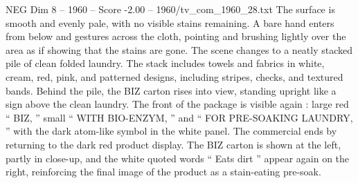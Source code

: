 \begin{textsample}{NEG Dim 8 – 1960 – Score -2.00 – 1960/tv\_com\_1960\_28.txt}
The surface is smooth and evenly pale, with no visible stains remaining.
A bare hand enters from below and gestures across the cloth, pointing and brushing lightly over the area as if showing that the stains are gone.
The scene changes to a neatly stacked pile of clean folded laundry.
The stack includes towels and fabrics in white, cream, red, pink, and patterned designs, including stripes, checks, and textured bands.
Behind the pile, the BIZ carton rises into view, standing upright like a sign above the clean laundry.
The front of the package is visible again : large red “ BIZ, ” small “ WITH BIO-ENZYM, ” and “ FOR PRE-SOAKING LAUNDRY, ” with the dark atom-like symbol in the white panel.
The commercial ends by returning to the dark red product display.
The BIZ carton is shown at the left, partly in close-up, and the white quoted words “ Eats dirt ” appear again on the right, reinforcing the final image of the product as a stain-eating pre-soak.

\end{textsample}
